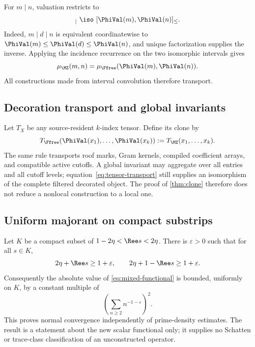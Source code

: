 For \(m\mid n\), valuation restricts to
\begin{equation}
 [m,n]_{\mid}\ \iso\
 [\PhiVal(m),\PhiVal(n)]_{\le}.
 \label{eq:interval-isomorphism}
\end{equation}
Indeed, \(m\mid d\mid n\) is equivalent coordinatewise to
\(
 \PhiVal(m)\le\PhiVal(d)\le\PhiVal(n)
\), and unique factorization supplies the inverse.  Applying the incidence
recurrence on the two isomorphic intervals gives
\begin{equation}
 \mu_{\MZ}(m,n)
 =\mu_{\Ffree}(\PhiVal(m),\PhiVal(n)).
 \label{eq:mobius-transport}
\end{equation}
All constructions made from interval convolution therefore transport.

\subsection{Decoration transport and global invariants}

Let \(T_X\) be any source-resident \(k\)-index tensor.  Define its clone by
\begin{equation}
 T_{\Ffree}(\PhiVal(x_1),\ldots,\PhiVal(x_k))
 :=T_{\MZ}(x_1,\ldots,x_k).
 \label{eq:tensor-transport}
\end{equation}
The same rule transports roof marks, Gram kernels, compiled coefficient
arrays, and compatible active cutoffs.  A global invariant may aggregate
over all entries and all cutoff levels; equation~\eqref{eq:tensor-transport}
still supplies an isomorphism of the complete filtered decorated object.
The proof of \cref{thm:clone} therefore does not reduce a nonlocal
construction to a local one.

\subsection{Uniform majorant on compact substrips}

Let \(K\) be a compact subset of
\(
 1-2\eta<\Ree s<2\eta
\).  There is \(\varepsilon>0\) such that for all \(s\in K\),
\begin{equation}
 2\eta+\Ree s\ge1+\varepsilon,
 \qquad
 2\eta+1-\Ree s\ge1+\varepsilon.
 \label{eq:uniform-exponents}
\end{equation}
Consequently the absolute value of \eqref{eq:mixed-functional} is bounded,
uniformly on \(K\), by a constant multiple of
\begin{equation}
 \left(\sum_{n\ge2}n^{-1-\varepsilon}\right)^2.
 \label{eq:uniform-majorant}
\end{equation}
This proves normal convergence independently of prime-density estimates.
The result is a statement about the new scalar functional only; it supplies
no Schatten or trace-class classification of an unconstructed operator.

